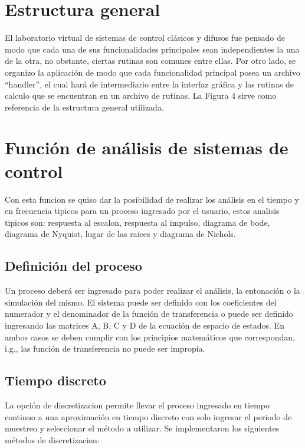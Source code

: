 \section{Estructura general}

    El laboratorio virtual de sistemas de control clásicos y difusos fue pensado de modo que cada una de sus funcionalidades principales sean independientes la una de la otra, no obstante, ciertas rutinas son comunes entre ellas. Por otro lado, se organizo la aplicación de modo que cada funcionalidad principal posea un archivo \enquote{handler}, el cual hará de intermediario entre la interfaz gráfica y las rutinas de calculo que se encuentran en un archivo de rutinas. La Figura 4 sirve como referencia de la estructura general utilizada.


\section{Función de análisis de sistemas de control}
    
    Con esta funcion se quiso dar la posibilidad de realizar los análisis en el tiempo y en frecuencia tipicos para un proceso ingresado por el usuario, estos analisis tipicos son: respuesta al escalon, respuesta al impulso, diagrama de bode, diagrama de Nyquist, lugar de las raices y diagrama de Nichols.

    \subsection{Definición del proceso}

        Un proceso deberá ser ingresado para poder realizar el análisis, la entonación o la simulación del mismo. El sistema puede ser definido con los coeficientes del numerador y el denominador de la función de transferencia o puede ser definido ingresando las matrices A, B, C y D de la ecuación de espacio de estados. En ambos casos se deben cumplir con los principios matemáticos que correspondan, i.g., las función de transferencia no puede ser impropia.

    \subsection{Tiempo discreto}

        La opción de discretizacion permite llevar el proceso ingresado en tiempo continuo a una aproximación en tiempo discreto con solo ingresar el periodo de muestreo y seleccionar el método a utilizar. Se implementaron los siguientes métodos de discretizacion:

